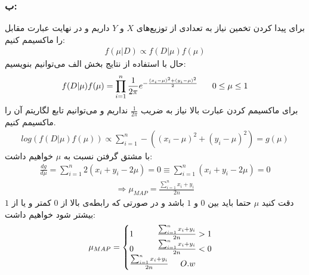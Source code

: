 \documentclass[12pt,onecolumn,a4paper]{article}
\newcommand{\eng}[1]{{\lr{\selectfont #1}}}
\begin{document}
\subsubsection*{ب:}
برای پیدا کردن تخمین 
\eng{MAP}
نیاز به تعدادی 
\eng{Sample}
از توزیع‌های 
$X$
و
$Y$
داریم و در نهایت عبارت مقابل را ماکسیمم کنیم:
\begin{align*}
	f(\mu | D) \propto f(D | \mu) f(\mu)
\end{align*}
حال با استفاده از نتایج بخش الف می‌توانیم بنویسیم:
\begin{align*}
	f(D | \mu) f(\mu) = \prod_{i = 1}^{n} \frac{1}{2\pi}e^{-\frac{(x_i-\mu)^2 + (y_i-\mu)^2}{2}} \hspace{0.6 cm} 0 \leq \mu \leq 1
\end{align*}
برای ماکسیمم کردن عبارت بالا نیاز به ضریب
$\frac{1}{2\pi}$
نداریم و می‌توانیم تابع لگاریتم آن را ماکسیمم کنیم.
\begin{align*}
	log(f(D | \mu) f(\mu)) \propto \sum_{i = 1}^{n} -((x_i-\mu)^2 + (y_i - \mu)^2) = g(\mu)
\end{align*}
با مشتق گرفتن نسبت به
$\mu$
خواهیم داشت:
\begin{align*}
	\frac{dg}{d\mu} = \sum_{i = 1}^n 2 (x_i + y_i - 2\mu) = 0 \equiv \sum_{i = 1}^n  (x_i + y_i - 2\mu) = 0 
\end{align*}
\begin{align*}
	\Rightarrow \mu_{MAP} = \frac{\sum_{i = 1}^n x_i + y_i}{2n}
\end{align*}
دقت کنید 
$\mu$
حتما باید بین 
$0$
و
$1$
باشد و در صورتی که رابطه‌ی بالا از 
$0$
کمتر و یا از 
$1$
بیشتر شود خواهیم داشت:
\begin{align*}
	\mu_{MAP} =  \begin{cases}
		1 \hspace{1cm} \frac{\sum_{i = 1}^n x_i + y_i}{2n} > 1 \\
		0 \hspace{1cm} \frac{\sum_{i = 1}^n x_i + y_i}{2n} < 0
		\\
		\frac{\sum_{i = 1}^n x_i + y_i}{2n} \hspace{0.5 cm} O.w
	\end{cases}
\end{align*}
\end{document}
